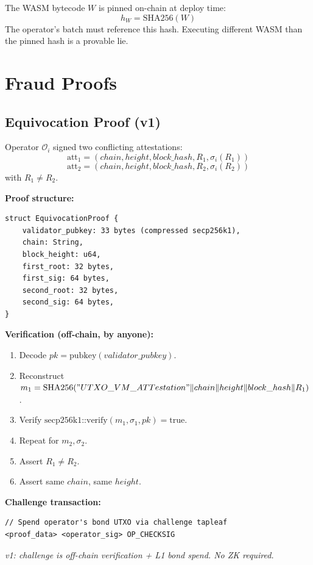 \documentclass[a4paper,11pt]{article}
\begin{document}
The WASM bytecode $W$ is pinned on-chain at deploy time:
\[
    h_W = \text{SHA256}(W)
\]
The operator's batch must reference this hash. Executing different WASM than the pinned hash is a provable lie.

\section{Fraud Proofs}
\label{sec:fraud}

\subsection{Equivocation Proof (v1)}

Operator $\mathcal{O}_i$ signed two conflicting attestations:
\[
    \text{att}_1 = (chain, height, block\_hash, R_1, \sigma_i(R_1))
\]
\[
    \text{att}_2 = (chain, height, block\_hash, R_2, \sigma_i(R_2))
\]
with $R_1 \neq R_2$.

\textbf{Proof structure:}
\begin{lstlisting}[style=script]
struct EquivocationProof {
    validator_pubkey: 33 bytes (compressed secp256k1),
    chain: String,
    block_height: u64,
    first_root: 32 bytes,
    first_sig: 64 bytes,
    second_root: 32 bytes,
    second_sig: 64 bytes,
}
\end{lstlisting}

\textbf{Verification (off-chain, by anyone):}
\begin{enumerate}[nosep]
    \item Decode $pk = \text{pubkey}(validator\_pubkey)$.
    \item Reconstruct $m_1 = \text{SHA256}("UTXO\_VM\_ATTestation" \| chain \| height \| block\_hash \| R_1)$.
    \item Verify $\text{secp256k1::verify}(m_1, \sigma_1, pk) = \text{true}$.
    \item Repeat for $m_2, \sigma_2$.
    \item Assert $R_1 \neq R_2$.
    \item Assert same $chain$, same $height$.
\end{enumerate}

\textbf{Challenge transaction:}
\begin{lstlisting}[style=script]
// Spend operator's bond UTXO via challenge tapleaf
<proof_data> <operator_sig> OP_CHECKSIG
\end{lstlisting}

\noindent\textit{v1: challenge is off-chain verification + L1 bond spend. No ZK required.}
\end{document}
